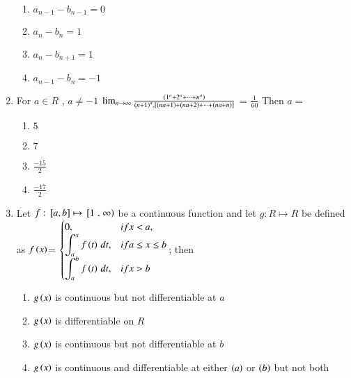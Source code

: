\documentclass[journal,12pt,twocolumn]{IEEEtran}
\theoremstyle{remark}
\begin{document}
\begin{enumerate}
    \hfill 
    {}
    
    \begin{enumerate}[label=(\alph*)]
        
        \item $a_{n-1}-b_{n-1}=0$ 
        \item $a_n-b_n=1$ 
        \item $a_n-b_{n+1}=1$ 
        \item $a_{n-1}-b_n=-1$ 
    \end{enumerate}


    \item 
    {For $a\in R$ , $a\neq -1$ 
    $\lim_{n\to\infty}\frac{\left(1^a+2^a+\cdots+n^a\right)}{\left(n+1\right)^a.{}\left[\left(na+1\right)+\left(na+2\right)+\cdots+\left(na+n\right)\right]}$ = $\frac{1}{60}$ Then $a=$ }

    \hfill 
    {}
    
    \begin{enumerate}[label=(\alph*)]
        
        \item $5$
        \item $7$ 
        \item $\frac{-15}{2}$ 
        \item $\frac{-17}{2}$ 
    \end{enumerate}


    \item 
    {Let $f: {}\left[a,b\right]\mapsto {}\left[1\right.,\left.\infty\right)$ be a continuous function and let $g: R\mapsto R$ be defined as 
    $f\left(x\right)$= 
    $\begin{cases}
       0, & if x<a, \\
       \displaystyle \int_{a}^{x}{f\left(t\right) \, dt}, & if a\leq x\leq b \\
       \displaystyle \int_{a}^{b}{f\left(t\right) \, dt}, & if x>b
    \end{cases}$; then} 

    \hfill 
    {}
    
    \begin{enumerate}[label=(\alph*)]
        
        \item $g\left(x\right)$ is continuous but not differentiable at $a$
        \item $g\left(x\right)$ is differentiable on $R$
        \item $g\left(x\right)$ is continuous but not differentiable at $b$
        \item $g\left(x\right)$ is continuous and differentiable at either $\left(a\right)$ or $\left(b\right)$ but not both 
    \end{enumerate}



\end{enumerate}
\end{document}
